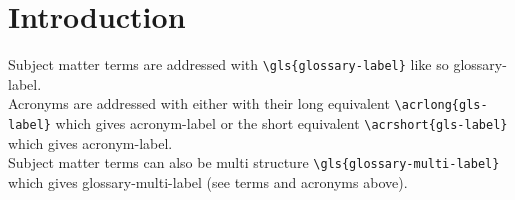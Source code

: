 \chapter{Introduction} \label{ch:intro}

Subject matter terms are addressed with \texttt{\textbackslash gls\{glossary-label\}} like so \gls{glossary-label}. \\
Acronyms are addressed with either with their long equivalent \texttt{\textbackslash acrlong\{gls-label\}} which gives \acrlong{acronym-label}
or the short equivalent \texttt{\textbackslash acrshort\{gls-label\}} which gives \acrshort{acronym-label}. \\
Subject matter terms can also be multi structure \texttt{\textbackslash gls\{glossary-multi-label\}} which gives \gls{glossary-multi-label}
(see terms and acronyms above).
